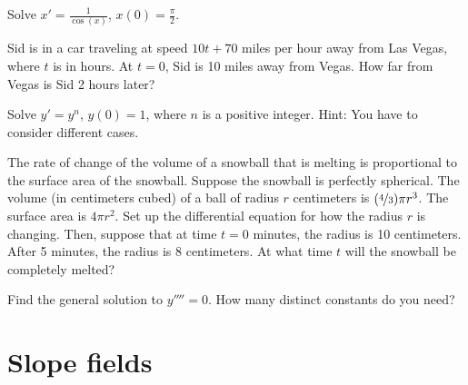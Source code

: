     \begin{exercise}
    Solve $x' = \frac{1}{\cos(x)}$, $x(0)=\frac{\pi}{2}$.
    \end{exercise}
    
    \begin{exercise}
    Sid is in a car traveling at speed $10t+70$ miles per hour away from Las Vegas,
    where $t$ is in hours.  At $t=0$, Sid is 10 miles away from Vegas.  How
    far from Vegas is Sid 2 hours later?
    \end{exercise}
    
    \begin{exercise}
    Solve $y' = y^n$, $y(0) = 1$, where $n$ is a positive integer.
    Hint: You have to consider different cases.
    \end{exercise}
    
    \begin{exercise}
    The rate of change of the volume of a snowball that is melting is 
    proportional to the surface area of the snowball.  Suppose the
    snowball is perfectly spherical.  The volume (in centimeters cubed)
    of a ball of radius $r$ centimeters is
    $(\nicefrac{4}{3}) \pi r^3$.  The surface area is
    $4 \pi r^2$.  Set up the differential equation for how the radius $r$ is changing.
    Then, suppose that at time $t=0$ minutes, the radius is 10 centimeters.
    After 5 minutes, the radius is 8 centimeters.  At what time $t$ will the 
    snowball be completely melted?
    \end{exercise}
    
    \begin{exercise}
    Find the general solution to $y''''= 0$.  How many distinct constants do you need?
    \end{exercise}
    

\sectionnewpage
\section{Slope fields}
\label{slopefields:section}




